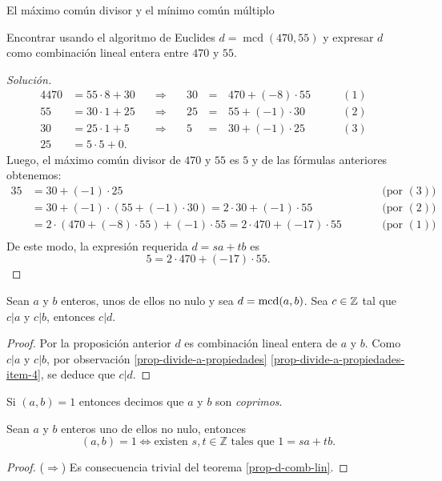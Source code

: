 \begin{section}{El máximo común divisor y el mínimo común múltiplo}
\begin{ejemplo*}
    Encontrar usando el algoritmo de Euclides $d = \operatorname{mcd}( 470, 55)$ y expresar $d$  como combinación lineal entera entre  $470$ y $55$.
\end{ejemplo*}
\begin{proof}[Solución]
    \begin{alignat*}4
    470&=55 \cdot 8 +30&\quad\Rightarrow\quad &30 &\,=\,&470 + (-8)\cdot 55&\qquad (1)&\\
    55&=30 \cdot 1 + 25&\quad\Rightarrow\quad &25 &\,=\,&55 +(-1)\cdot 30&\qquad (2)&\\
    30&=25 \cdot 1+5&\quad\Rightarrow\quad &5 &\,=\,&30 +(-1) \cdot 25&\qquad (3)& \\
    25&=5\cdot 5+0.&&&&&&
    \end{alignat*}
    Luego,  el máximo común divisor de $470$ y $55$ es $5$ y de las fórmulas anteriores obtenemos:
    \begin{alignat*}3
    5 &= 30 +(-1) \cdot 25& &\qquad \text{(por $(3)$)} && \\
    &= 30 + (-1) \cdot (55 +(-1)\cdot 30) = 2 \cdot 30 + (-1) \cdot 55& &\qquad \text{(por $(2)$)}&& \\   
    &=  2 \cdot (470 + (-8)\cdot 55) + (-1) \cdot 55 = 2 \cdot 470 +(-17)\cdot 55& &\qquad \text{(por $(1)$)}&&\\    
    \end{alignat*}
    De este modo, la expresión requerida $d=sa+tb$ es
    $$
    5=2 \cdot 470 +(-17)\cdot 55.
    $$
\end{proof}

\begin{corolario}
    Sean  $a$ y $b$ enteros,  unos de ellos no nulo y  sea $d = \operatorname{mcd}(a,b)$. Sea $c \in {\mathbb Z}$ tal que $c|a$ y $c|b$,  entonces $c|d$. 
\end{corolario}
\begin{proof}
    Por la proposición anterior $d$  es combinación lineal entera de $a$ y $b$. Como $c|a$ y $c|b$, por observación \ref{prop-divide-a-propiedades} \ref{prop-divide-a-propiedades-item-4}, se deduce que  $c|d$.
\end{proof}

\begin{definicion}
    Si $(a,b)=1$ entonces decimos que $a$ y $ b$ son \textit{coprimos}.
\end{definicion}


\begin{corolario} Sean $a$ y $b$ enteros uno de ellos no nulo, entonces
    $$
    (a,b) = 1 \Leftrightarrow \text{existen $s,t \in \mathbb Z$ tales que $1 = sa+tb$.}
    $$
\end{corolario}
\begin{proof}
    ($\Rightarrow$) Es consecuencia trivial  del teorema \ref{prop-d-comb-lin}. 
    

\end{proof}
\end{section}
